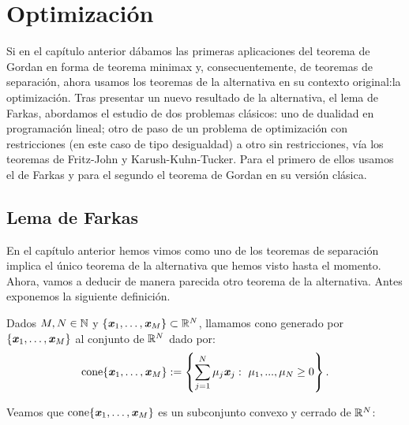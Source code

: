 \chapter{Optimización}
Si en el capítulo anterior dábamos las primeras aplicaciones del teorema de Gordan en forma de teorema minimax y, consecuentemente, de teoremas de separación, ahora usamos los teoremas de la alternativa en su contexto original:la optimización. Tras presentar un nuevo resultado de la alternativa, el lema de Farkas, abordamos el estudio de dos problemas clásicos: uno de dualidad en programación lineal; otro de paso de un problema de optimización con restricciones (en este caso de tipo desigualdad) a otro sin restricciones, vía los teoremas de Fritz-John y Karush-Kuhn-Tucker. Para el primero de ellos usamos el de Farkas y para el segundo el teorema de Gordan en su versión clásica.

\section{Lema de Farkas}
\newcommand{\bb}{\textbf{\emph{b}}}
\newcommand{\cc}{\textbf{\emph{c}}}

En el capítulo anterior hemos vimos como uno de los teoremas de separación implica el único teorema de la alternativa que hemos visto hasta el momento. Ahora, vamos a deducir de manera parecida otro teorema de la alternativa. Antes exponemos la siguiente definición.

\begin{definicion}
	Dados $ M, N \in \mathbb{N} $ y $ \{\textbf{\emph{x}}_1,\dots, \textbf{\emph{x}}_M \} \subset \mathbb{R}^N  $, llamamos cono generado por $ \{\textbf{\emph{x}}_1,\dots, \textbf{\emph{x}}_M \} $ al conjunto de $ \mathbb{R}^N $ dado por:
	\begin{equation*}
	\mathrm{cone}\{\textbf{\emph{x}}_1,\dots, \textbf{\emph{x}}_M \} := \left\lbrace \sum_{j=1}^{N}{\mu_j \textbf{\emph{x}}_j } : \text{ } \mu_1,...,\mu_N \geq 0 \right\rbrace .
	\end{equation*}
\end{definicion}

Veamos que $ \mathrm{cone}\{\textbf{\emph{x}}_1,\dots, \textbf{\emph{x}}_M \} $ es un subconjunto convexo y cerrado de $ \mathbb{R}^N $:

